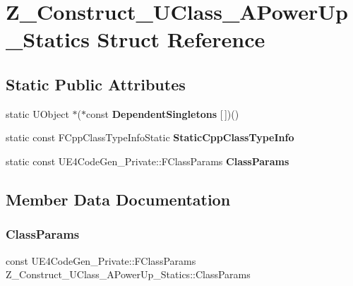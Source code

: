 \hypertarget{struct_z___construct___u_class___a_power_up___statics}{}\section{Z\+\_\+\+Construct\+\_\+\+U\+Class\+\_\+\+A\+Power\+Up\+\_\+\+Statics Struct Reference}
\label{struct_z___construct___u_class___a_power_up___statics}
\subsection*{Static Public Attributes}
\begin{DoxyCompactItemize}
\item 
\mbox{\label{struct_z___construct___u_class___a_power_up___statics_a966aca7d0ef5682b4de584e867ab8a90}} 
static U\+Object $\ast$($\ast$const {\bfseries Dependent\+Singletons} \mbox{[}$\,$\mbox{]})()
\item 
static const F\+Cpp\+Class\+Type\+Info\+Static {\bfseries Static\+Cpp\+Class\+Type\+Info}
\item 
static const U\+E4\+Code\+Gen\+\_\+\+Private\+::\+F\+Class\+Params {\bfseries Class\+Params}
\end{DoxyCompactItemize}


\subsection{Member Data Documentation}
\mbox{\label{struct_z___construct___u_class___a_power_up___statics_adefa1103bef6f992e187a6fd4cf8e429}} 
\subsubsection{\texorpdfstring{ClassParams}{ClassParams}}
{\footnotesize\ttfamily const U\+E4\+Code\+Gen\+\_\+\+Private\+::\+F\+Class\+Params Z\+\_\+\+Construct\+\_\+\+U\+Class\+\_\+\+A\+Power\+Up\+\_\+\+Statics\+::\+Class\+Params\hspace{0.3cm}{\ttfamily [static]}}

